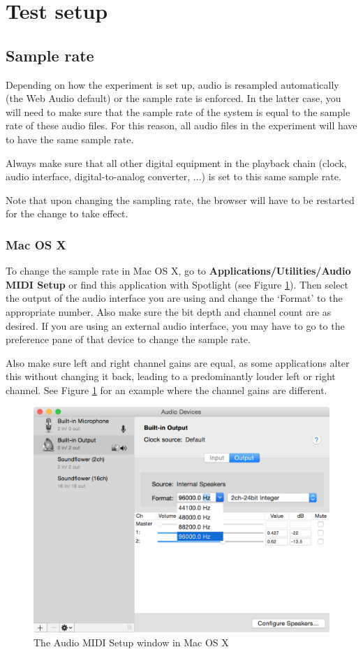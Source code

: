 \documentclass[11pt, oneside]{article}   	%
\begin{document}
\clearpage


\section{Test setup}

	\subsection{Sample rate}
		Depending on how the experiment is set up, audio is resampled automatically (the Web Audio default) or the sample rate is enforced. In the latter case, you will need to make sure that the sample rate of the system is equal to the sample rate of these audio files. For this reason, all audio files in the experiment will have to have the same sample rate. 

		Always make sure that all other digital equipment in the playback chain (clock, audio interface, digital-to-analog converter, ...) is set to this same sample rate.

		Note that upon changing the sampling rate, the browser will have to be restarted for the change to take effect. 
		
		\subsubsection{Mac OS X}
			To change the sample rate in Mac OS X, go to \textbf{Applications/Utilities/Audio MIDI Setup} or find this application with Spotlight (see Figure \ref{fig:audiomidisetup}). Then select the output of the audio interface you are using and change the `Format' to the appropriate number. Also make sure the bit depth and channel count are as desired. 
			If you are using an external audio interface, you may have to go to the preference pane of that device to change the sample rate. 

			Also make sure left and right channel gains are equal, as some applications alter this without changing it back, leading to a predominantly louder left or right channel. See Figure \ref{fig:audiomidisetup} for an example where the channel gains are different. 

			\begin{figure}[tb]
				\centering
				\includegraphics[width=.65\textwidth]{img/audiomidisetup.png}
				\caption{The Audio MIDI Setup window in Mac OS X}
				\label{fig:audiomidisetup}
			\end{figure}
		
\end{document}
